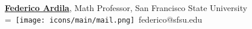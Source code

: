 \documentclass[]{plushcv}
\begin{document}
\begin{minipage}[t]{0.25\textwidth}
\sectionsep
\href{https://fardila.com/}{\textbf{Federico Ardila}}, Math Professor, San Francisco State University 
\\
\begingroup
{}=\hbox{
\texttt{[image: icons/main/mail.png]}\hspace{0.3cm} federico@sfsu.edu 
}
\parbox{\wd0}{}
\endgroup
\\






\end{minipage} 
\end{document}
